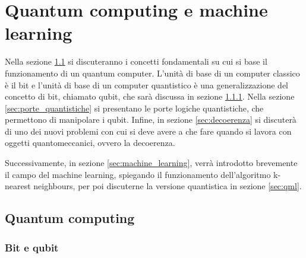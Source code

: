 \chapter{Quantum computing e machine learning}\label{ch:teoria}


Nella sezione \ref{sec:quantum_computing} si discuteranno i concetti fondamentali su 
cui si base il funzionamento di un quantum computer. 
L'unità di base di un computer classico è il bit e l'unità di base di 
un computer quantistico è una generalizzazione del concetto di bit, 
chiamato qubit, che sarà discussa in sezione \ref{sec:qubit}. 
Nella sezione \ref{sec:porte_quantistiche} si presentano le porte 
logiche quantistiche, che permettono di manipolare i qubit. 
Infine, in sezione \ref{sec:decoerenza} si discuterà di uno dei nuovi problemi con 
cui si deve avere a che fare quando si lavora con oggetti quantomeccanici, ovvero 
la decoerenza. 

Successivamente, in sezione \ref{sec:machine_learning}, verrà introdotto brevemente 
il campo del machine learning, spiegando il funzionamento dell'algoritmo k-nearest neighbours, 
per poi discuterne la versione quantistica in sezione \ref{sec:qml}. 

\section{Quantum computing} \label{sec:quantum_computing}

\subsection{Bit e qubit} \label{sec:qubit}

